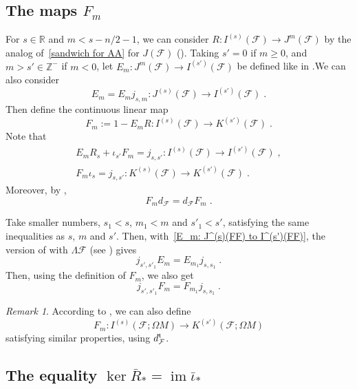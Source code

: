 \documentclass{memo-l}
\theoremstyle{plain}
\theoremstyle{definition}
\theoremstyle{remark}
\newtheorem{rem}[thm]{Remark}
\newcommand{\R}{\mathbb{R}}
\newcommand{\Z}{\mathbb{Z}}
\newcommand{\FF}{\mathcal{F}}
\newcommand{\im}{\operatorname{im}}
\newcommand{\trans}{{\text{\rm t}}}
\numberwithin{section}{chapter}
\numberwithin{equation}{section}%
\begin{document}
\subsection{The maps $F_m$}\label{ss: F_m}

For $s\in\R$ and $m<s-n/2-1$, we can consider $R:I^{(s)}(\FF)\to J^m(\FF)$ by the analog of~\eqref{sandwich for AA} for $J(\FF)$ (). Taking $s'=0$ if $m\ge0$, and $m>s'\in\Z^-$ if $m<0$, let $E_m:J^m(\FF)\to I^{(s')}(\FF)$ be defined like in .We can also consider
\begin{equation}\label{E_m: J^(s)(FF) to I^(s')(FF)}
E_m=E_mj_{s,m}:J^{(s)}(\FF)\to I^{(s')}(\FF)\;.
\end{equation}
Then define the continuous linear map 
\[
F_m:=1-E_mR:I^{(s)}(\FF)\to K^{(s')}(\FF)\;.
\]
Note that
\begin{gather}
E_mR_s+\iota_{s'}F_m=j_{s,s'}:I^{(s)}(\FF)\to I^{(s')}(\FF)\;,\label{E_m R_s + iota_s' F_m = j_s s'}\\
F_m\iota_s=j_{s,s'}:K^{(s)}(\FF)\to K^{(s')}(\FF)\;.\label{F_m iota_s = j_s s'}
\end{gather}
Moreover, by ,
\begin{equation}\label{F_m d_FF = d_FF F_m}
F_m d_\FF=d_\FF F_m\;.
\end{equation}

Take smaller numbers, $s_1<s$, $m_1<m$ and $s'_1<s'$, satisfying the same inequalities as $s$, $m$ and $s'$. Then, with~\eqref{E_m: J^(s)(FF) to I^(s')(FF)}, the version of  with $\Lambda\FF$ (see ) gives
\begin{equation}\label{j_s' s'_1 E_m = E_m_1 j_s s_1}
j_{s',s'_1}E_m=E_{m_1}j_{s,s_1}\;.
\end{equation}
Then, using the definition of $F_m$, we also get
\begin{equation}\label{j_s' s'_1 F_m = F_m_1 j_s s_1}
j_{s',s'_1}F_m=F_{m_1}j_{s,s_1}\;.
\end{equation}

\begin{rem}\label{r: F_m with Omega M}
According to , we can also define
\[
F_m:I^{(s)}(\FF;\Omega M)\to K^{(s')}(\FF;\Omega M)
\]
satisfying similar properties, using $d_\FF^\trans$.
\end{rem}


\subsection{The equality $\ker\bar R_*=\im\bar\iota_*$}
\label{ss: ker bar R_* = im bar iota_*}
\end{document}
